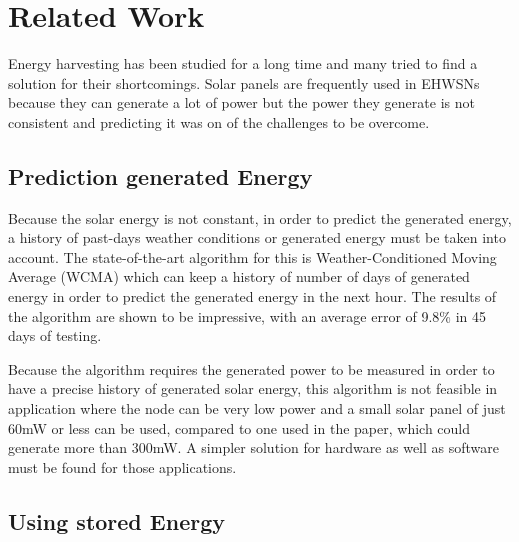\normalfont\normalsize
\chapter{Related Work}
\label{chap:related}

Energy harvesting has been studied for a long time and many tried to find a solution for their
shortcomings. Solar panels are frequently used in EHWSNs because they can generate a lot of power
but the power they generate is not consistent and predicting it was on of the challenges to be
overcome.

\section {Prediction generated Energy}

Because the solar energy is not constant, in order to predict the generated energy, a history of
past-days weather conditions or generated energy must be taken into account. The state-of-the-art
algorithm for this is Weather-Conditioned Moving Average (WCMA) \cite{piorno2009prediction} which
can keep a history of number of days of generated energy in order to predict the generated energy
in the next hour. The results of the algorithm are shown to be impressive, with an average error of
9.8\% in 45 days of testing.

Because the algorithm requires the generated power to be measured in order to have a precise
history of generated solar energy, this algorithm is not feasible in application where the node
can be very low power and a small solar panel of just 60mW or less can be used, compared to one
used in the paper, which could generate more than 300mW. A simpler solution for hardware as well as
software must be found for those applications.


\section {Using stored Energy}

